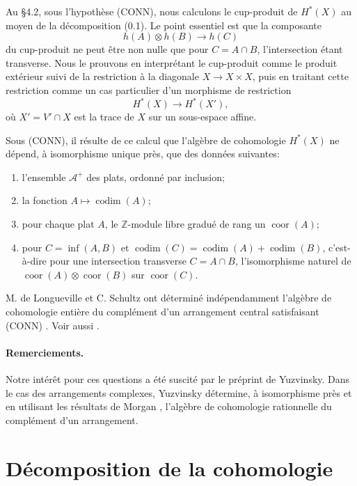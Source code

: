 \documentclass[11pt]{article}
\theoremstyle{definition}
\newcommand{\ZZ}{\mathbb Z}
\newcommand{\codim}{\operatorname{codim}}
\newcommand{\coor}{\operatorname{coor}}
\begin{document}
Au §4.2, sous l'hypothèse \textup{(CONN)}, nous calculons le cup-produit de $H^*(X)$ au moyen de la décomposition (0.1). Le point essentiel est que la composante
\[
 h(A)\otimes h(B)\longrightarrow h(C)
\]
du cup-produit ne peut être non nulle que pour $C=A\cap B$, l'intersection étant transverse. Nous le prouvons en interprétant le cup-produit comme le produit extérieur suivi de la restriction à la diagonale $X\to X\times X$, puis en traitant cette restriction comme un cas particulier d'un morphisme de restriction
\[
H^*(X)\longrightarrow H^*(X'),
\]
où $X'=V'\cap X$ est la trace de $X$ sur un sous-espace affine.

Sous \textup{(CONN)}, il résulte de ce calcul que l'algèbre de cohomologie $H^*(X)$ ne dépend, à isomorphisme unique près, que des données suivantes:
\begin{enumerate}[label=(\alph*)]
\item l'ensemble $\mathcal A^+$ des plats, ordonné par inclusion;
\item la fonction $A\mapsto\codim(A)$;
\item pour chaque plat $A$, le $\ZZ$-module libre gradué de rang un $\coor(A)$;
\item pour $C=\inf(A,B)$ et $\codim(C)=\codim(A)+\codim(B)$, c'est-à-dire pour une intersection transverse $C=A\cap B$, l'isomorphisme naturel de $\coor(A)\otimes\coor(B)$ sur $\coor(C)$.
\end{enumerate}

M. de Longueville et C. Schultz ont déterminé indépendamment l'algèbre de cohomologie entière du complément d'un arrangement central satisfaisant \textup{(CONN)} \cite{dS}. Voir aussi \cite{FZ}.

\paragraph{Remerciements.} Notre intérêt pour ces questions a été suscité par le préprint \cite{Y} de Yuzvinsky. Dans le cas des arrangements complexes, Yuzvinsky détermine, à isomorphisme près et en utilisant les résultats de Morgan \cite{M}, l'algèbre de cohomologie rationnelle du complément d'un arrangement.

\section{Décomposition de la cohomologie}
\end{document}
